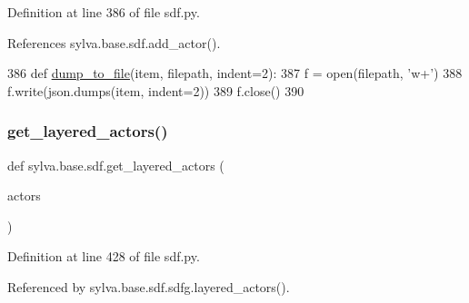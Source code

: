 Definition at line 386 of file sdf.\+py.



References sylva.\+base.\+sdf.\+add\+\_\+actor().


\begin{DoxyCode}
386     \textcolor{keyword}{def }\hyperlink{namespacesylva_1_1base_1_1sdf_a55c1c6ea91b0ed9948ce670cd269b88b}{dump\_to\_file}(item, filepath, indent=2):
387         f = open(filepath, \textcolor{stringliteral}{'w+'})
388         f.write(json.dumps(item, indent=2))
389         f.close()
390 
\end{DoxyCode}
\mbox{\label{namespacesylva_1_1base_1_1sdf_a1e0fb379d9b6a1f2adb650611bdb49e6}} 
\subsubsection{\texorpdfstring{get\+\_\+layered\+\_\+actors()}{get\_layered\_actors()}}
{\footnotesize\ttfamily def sylva.\+base.\+sdf.\+get\+\_\+layered\+\_\+actors (\begin{DoxyParamCaption}\item[{}]{actors }\end{DoxyParamCaption})}



Definition at line 428 of file sdf.\+py.



Referenced by sylva.\+base.\+sdf.\+sdfg.\+layered\+\_\+actors().


